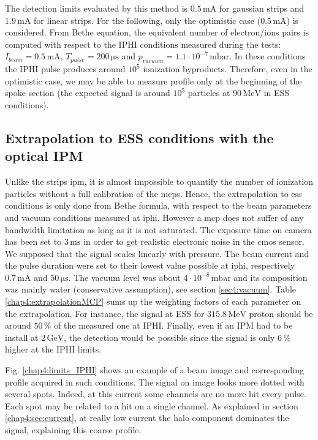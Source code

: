 \begin{refsection}
  The detection limits evaluated by this method is $0.5\,\mathrm{mA}$ for gaussian strips and $1.9\,\mathrm{mA}$ for linear strips. For the following, only the optimistic case ($0.5\,\mathrm{mA}$) is considered. From Bethe equation, the equivalent number of electron/ions pairs is computed with respect to the IPHI conditions measured during the tests: $I_{beam}=0.5\,\mathrm{mA}$, $T_{pulse}=200\,\mathrm{\mu s}$ and $p_{vacuum}=1.1 \cdot 10^{-7}\,\mathrm{mbar}$.
  In these conditions the IPHI pulse produces around $10^{5}$ ionization byproducts.
  Therefore, even in the optimistic case, we may be able to measure profile only at the beginning of the spoke section (the expected signal is around $10^{5}$ particles at $90\,\mathrm{MeV}$ in ESS conditions).

  \subsection{Extrapolation to ESS conditions with the optical IPM}
  \label{chap4:sec:MCPess}
  Unlike the strips \acrshort{ipm}, it is almost impossible to quantify the number of ionization particles without a full calibration of the \acrshort{mcp}s. Hence, the extrapolation to \acrshort{ess} conditions is only done from Bethe formula, with respect to the beam parameters and vacuum conditions measured at \acrshort{iphi}.
  However a \acrshort{mcp} does not suffer of any bandwidth limitation as long as it is not saturated. The exposure time on camera has been set to $3\,\mathrm{ms}$ in order to get realistic electronic noise in the \acrshort{cmos} sensor.
  We supposed that the signal scales linearly with pressure. The beam current and the pulse duration were set to their lowest value possible at \acrshort{iphi}, respectively $0.7\,\mathrm{mA}$ and $50\,\mathrm{\mu s}$. The vacuum level was about $4 \cdot 10^{-8}\,\mathrm{mbar}$ and its composition was mainly water (conservative assumption), see section \ref{sec4:vacuum}. Table \ref{chap4:extrapolationMCP} sums up the weighting factors of each parameter on the extrapolation. For instance, the signal at ESS for $315.8\,\mathrm{MeV}$ proton should be around $50\,\mathrm{\%}$ of the measured one at IPHI. Finally, even if an IPM had to be install at $2\,\mathrm{GeV}$, the detection would be possible since the signal is only $6\,\%$ higher at the IPHI limits.
  
  

  Fig. \ref{chap4:limits_IPHI} shows an example of a beam image and corresponding profile acquired in such conditions. The signal on image looks more dotted with several spots. Indeed, at this current some channels are no more hit every pulse. Each spot may be related to a hit on a single channel. As explained in section \ref{chap4:sec:current}, at really low current the halo component dominates the signal, explaining this coarse profile.


\end{refsection}
